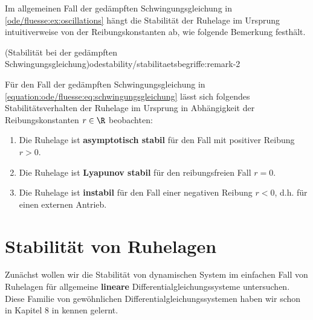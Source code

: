 \documentclass[letterpaper,10pt,german]{jupyterBook}
\begin{document}
\par
Im allgemeinen Fall der gedämpften Schwingungsgleichung in \cref{ode/fluesse:ex:oscillations} hängt die Stabilität der Ruhelage im Ursprung intuitiverweise von der Reibungskonstanten ab, wie folgende Bemerkung festhält.
\begin{remark}{(Stabilität bei der gedämpften Schwingungsgleichung)}{odestability/stabilitaetsbegriffe:remark-2}



\par
Für den Fall der gedämpften Schwingungsgleichung in \eqref{equation:ode/fluesse:eq:schwingungsgleichung} lässt sich folgendes Stabilitätsverhalten der Ruhelage im Ursprung in Abhängigkeit der Reibungskonstanten \(r \in \R\) beobachten:
\begin{enumerate}

\item {} 
\par
Die Ruhelage ist \textbf{asymptotisch stabil} für den Fall mit positiver Reibung \(r>0\).

\item {} 
\par
Die Ruhelage ist \textbf{Lyapunov stabil} für den reibungsfreien Fall \(r=0\).

\item {} 
\par
Die Ruhelage ist \textbf{instabil} für den Fall einer negativen Reibung \(r < 0\), d.h. für einen externen Antrieb.

\end{enumerate}
\end{remark}


\section{Stabilität von Ruhelagen}
\label{\detokenize{odestability/ruhelagen:stabilitat-von-ruhelagen}}\label{\detokenize{odestability/ruhelagen::doc}}
\par
Zunächst wollen wir die Stabilität von dynamischen System im einfachen Fall von Ruhelagen für allgemeine \textbf{lineare} Differentialgleichungssysteme untersuchen.
Diese Familie von gewöhnlichen Differentialgleichungssystemen haben wir schon in Kapitel 8 in \cite{Ten21} kennen gelernt.
\end{document}
